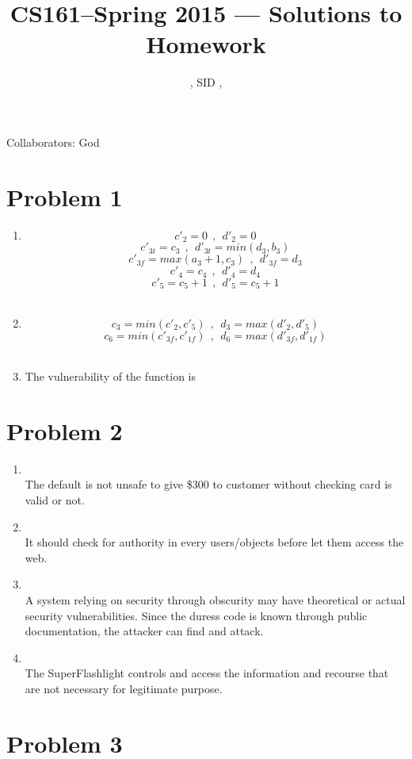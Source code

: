 \documentclass[11pt]{article}
\title{CS161--Spring 2015 --- Solutions to Homework \Homework}
\author{\Name, SID \SID, \texttt{\Login}}
\newenvironment{qparts}{\begin{enumerate}[{(}a{)}]}{\end{enumerate}}
\begin{document}
\maketitle

Collaborators: God

\section*{Problem 1}

\begin{qparts}
\item
$$c'_2 = 0\ \ ,\ \ d'_2 = 0$$
$$c'_{3t} = c_3\ \ ,\ \ d'_{3t} = min(d_3,b_3)$$
$$c'_{3f} = max(a_3 + 1,c_3)\ \ ,\ \  d'_{3f} = d_3$$
$$c'_4 = c_4\ \ ,\ \ d'_4 = d_4$$
$$c'_5 = c_5 + 1\ \ ,\ \ d'_5 = c_5 + 1$$
\\
\item
$$c_3 = min(c'_2,c'_5)\ \ ,\ \ d_3 = max(d'_2,d'_5)$$
$$c_6 = min(c'_{3f},c'_{1f})\ \ ,\ \ d_6 = max(d'_{3f},d'_{1f})$$
\\
\item
The vulnerability of the function is 
\end{qparts}


\newpage
\section*{Problem 2}
\begin{qparts}
\item
{}
\\
The default is not unsafe to give \$300 to customer without checking card is valid or not.
\item
{}
\\
It should check for authority in every users/objects before let them access the web.

\item
{}
\\
A system relying on security through obscurity may have theoretical or actual security vulnerabilities. Since the duress code is known through public documentation, the attacker can find and attack.
\item
{}
\\
The SuperFlashlight controls and access the information and recourse that are not necessary for legitimate purpose.
\end{qparts}
\newpage
\section*{Problem 3}
\end{document}
